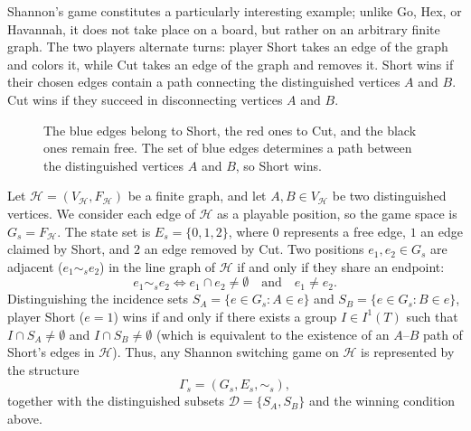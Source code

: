 Shannon's game constitutes a particularly interesting example; unlike Go, Hex, or Havannah, it does not take place on a board, but rather on an arbitrary finite graph. The two players alternate turns: player Short takes an edge of the graph and colors it, while Cut takes an edge of the graph and removes it. Short wins if their chosen edges contain a path connecting the distinguished vertices $A$ and $B$. Cut wins if they succeed in disconnecting vertices $A$ and $B$.
\begin{figure}[H]
	\centering
	\caption{The blue edges belong to Short, the red ones to Cut, and the black ones remain free. The set of blue edges determines a path between the distinguished vertices $A$ and $B$, so Short wins.}
\end{figure}

Let $\mathcal{H} = (V_{\mathcal{H}}, F_{\mathcal{H}})$ be a finite graph, and let $A, B \in V_{\mathcal{H}}$ be two distinguished vertices. We consider each edge of $\mathcal{H}$ as a playable
position, so the game space is $G_s = F_{\mathcal{H}}$. The state set is $E_s = \{0, 1, 2\}$,
where $0$ represents a free edge, $1$ an edge claimed by Short, and $2$ an edge removed by Cut.
Two positions $e_1, e_2 \in G_s$ are adjacent ($e_1 \sim_s e_2$) in the line graph of
$\mathcal{H}$ if and only if they share an endpoint:
\[
e_1 \sim_s e_2 \iff e_1 \cap e_2 \neq \emptyset \quad\text{and}\quad e_1 \neq e_2.
\]
Distinguishing the incidence sets $S_A = \{e \in G_s : A \in e\}$ and
$S_B = \{e \in G_s : B \in e\}$, player Short ($e=1$) wins if and only if there exists a
group $I \in I^1(T)$ such that $I \cap S_A \neq \emptyset$ and $I \cap S_B \neq \emptyset$
(which is equivalent to the existence of an $A$--$B$ path of Short's edges in $\mathcal{H}$).
Thus, any Shannon switching game on $\mathcal{H}$ is represented by the structure
$$\Gamma_s = (G_s, E_s, \sim_s),$$
together with the distinguished subsets $\mathcal{D}=\{S_A,S_B\}$ and the winning condition above.

